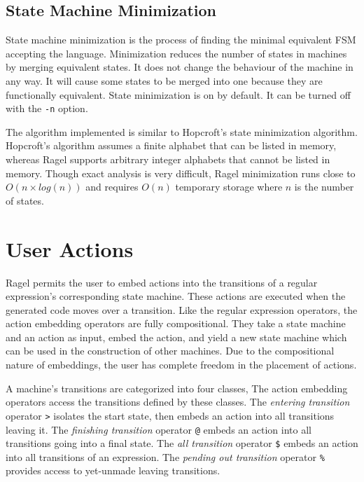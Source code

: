 \documentclass[letterpaper,11pt,oneside]{book}
\begin{document}

\section{State Machine Minimization}

State machine minimization is the process of finding the minimal equivalent FSM accepting
the language. Minimization reduces the number of states in machines
by merging equivalent states. It does not change the behaviour of the machine
in any way. It will cause some states to be merged into one because they are
functionally equivalent. State minimization is on by default. It can be turned
off with the \verb|-n| option.

The algorithm implemented is similar to Hopcroft's state minimization
algorithm. Hopcroft's algorithm assumes a finite alphabet that can be listed in
memory, whereas Ragel supports arbitrary integer alphabets that cannot be
listed in memory. Though exact analysis is very difficult, Ragel minimization
runs close to $O(n \times log(n))$ and requires $O(n)$ temporary storage where
$n$ is the number of states.

\chapter{User Actions}

Ragel permits the user to embed actions into the transitions of a regular
expression's corresponding state machine. These actions are executed when the
generated code moves over a transition.  Like the regular expression operators,
the action embedding operators are fully compositional. They take a state
machine and an action as input, embed the action, and yield a new state machine
which can be used in the construction of other machines. Due to the
compositional nature of embeddings, the user has complete freedom in the
placement of actions.

A machine's transitions are categorized into four classes, The action embedding
operators access the transitions defined by these classes.  The {\em entering
transition} operator \verb|>| isolates the start state, then embeds an action
into all transitions leaving it. The {\em finishing transition} operator
\verb|@| embeds an action into all transitions going into a final state.  The
{\em all transition} operator \verb|$| embeds an action into all transitions of
an expression. The {\em pending out transition} operator \verb|%| provides
access to yet-unmade leaving transitions. 
\end{document}
